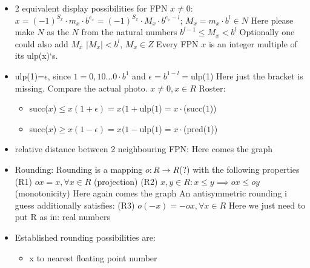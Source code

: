 \begin{itemize}
\begin{itemize}
    \item 2 equivalent display possibilities for FPN $x\not = 0:$
    \newline $x=(-1)^{S_x}\cdot m_x\cdot b^{e_x}=(-1)^{S_x}\cdot M_x\cdot b^{e_x-l}$; $M_x=m_x\cdot b^l \in N$
    \newline Here please make $N$ as the $N$ from the natural numbers
    \newline $b^{l-1}\leqslant M_x<b^l$
    \newline Optionally one could also add $M_x$
    \newline \implies $|M_x|<b^l$, $M_x\in Z$
    \newline \implies Every FPN $x$ is an integer multiple of its ulp(x)`s.
    \item ulp(1)=$\epsilon$, since $1=0,10...0\cdot b^1$ and $\epsilon=b^{1-l}=$ulp(1) 
    \newline Here just the bracket is missing. Compare the actual photo.
    \newline $x\not =0, x\in R$ \from Roster: 
    \begin{itemize}
        \item succ($x$)$\leqslant x(1+\epsilon)=x(1+$ulp($1$)$=x\cdot $(succ($1$))
        \item succ($x$)$\geqslant x(1-\epsilon)=x(1-$ulp($1$)$=x\cdot $(pred($1$))
    \end{itemize}
    \item relative distance between 2 neighbouring FPN:
    \newline Here comes the graph
    \item Rounding:
    \newline Rounding is a mapping $o:R\xrightarrow{}R $(?) with the following properties 
    \newline (R1) $ox=x, \forall x\in R$ (projection)
    \newline (R2) $x,y \in R: x\leqslant y \implies ox\leqslant oy$ (monotonicity)
    \newline Here again comes the graph
    \newline An antisymmetric rounding i guess additionally satisfies:
    \newline (R3) $o(-x)=-ox, \forall x\in R$
    \newline Here we just need to put R as in: real numbers
    \item Established rounding possibilities are:
    \begin{itemize}
        \item \square x to nearest floating point number 

\end{itemize}
\end{itemize}
\end{itemize}
